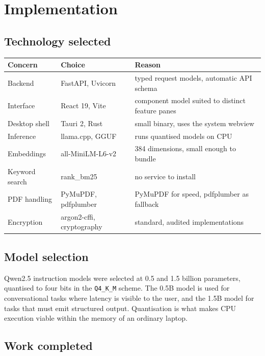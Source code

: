 \documentclass[11pt,a4paper]{article}
\begin{document}
\section{Implementation}

\subsection{Technology selected}

\begin{center}
\small
\begin{tabular}{@{}lll@{}}
\toprule
\textbf{Concern} & \textbf{Choice} & \textbf{Reason} \\
\midrule
Backend & FastAPI, Uvicorn & typed request models, automatic API schema \\
Interface & React 19, Vite & component model suited to distinct feature panes \\
Desktop shell & Tauri 2, Rust & small binary, uses the system webview \\
Inference & llama.cpp, GGUF & runs quantised models on CPU \\
Embeddings & all-MiniLM-L6-v2 & 384 dimensions, small enough to bundle \\
Keyword search & rank\_bm25 & no service to install \\
PDF handling & PyMuPDF, pdfplumber & PyMuPDF for speed, pdfplumber as fallback \\
Encryption & argon2-cffi, cryptography & standard, audited implementations \\
\bottomrule
\end{tabular}
\end{center}

\subsection{Model selection}

Qwen2.5 instruction models were selected at 0.5 and 1.5 billion parameters,
quantised to four bits in the \texttt{Q4\_K\_M} scheme. The 0.5B model is used
for conversational tasks where latency is visible to the user, and the 1.5B
model for tasks that must emit structured output. Quantisation is what makes
CPU execution viable within the memory of an ordinary laptop.

\subsection{Work completed}
\end{document}
